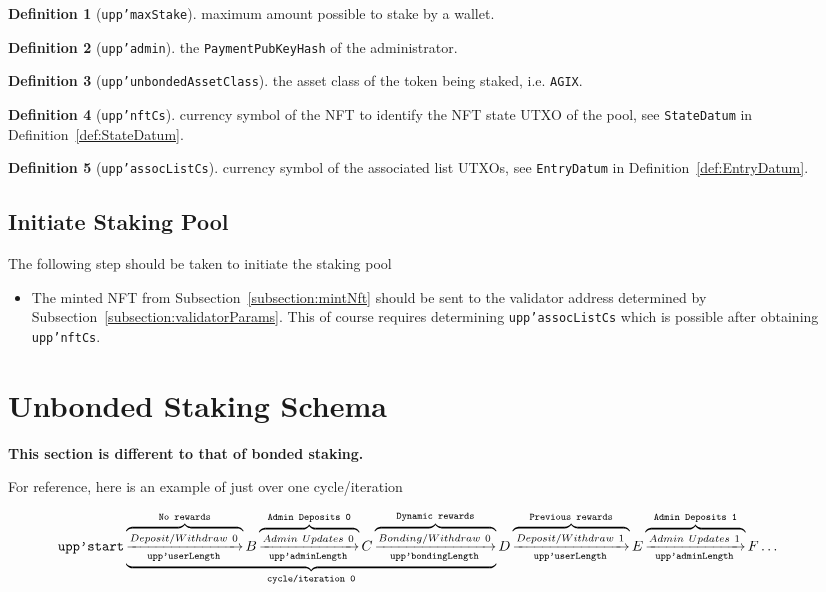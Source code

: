 \documentclass[10pt, a4paper]{article}
\theoremstyle{definition}
\newtheorem{definition}{Definition}[section]
\begin{document}
\begin{definition}[\texttt{upp'maxStake}]\label{def:upp'maxStake}
maximum amount possible to stake by a wallet.
\end{definition}

\begin{definition}[\texttt{upp'admin}]\label{def:upp'admin}
the \texttt{PaymentPubKeyHash} of the administrator.
\end{definition}

\begin{definition}[\texttt{upp'unbondedAssetClass}]\label{def:upp'unbondedAssetClass}
the asset class of the token being staked, i.e. \texttt{AGIX}.
\end{definition}

\begin{definition}[\texttt{upp'nftCs}]\label{def:upp'nftCs}
currency symbol of the NFT to identify the NFT state UTXO of the pool, see \texttt{StateDatum} in Definition~\ref{def:StateDatum}.
\end{definition}

\begin{definition}[\texttt{upp'assocListCs}]\label{def:upp'assocListCs}
currency symbol of the associated list UTXOs, see \texttt{EntryDatum} in Definition~\ref{def:EntryDatum}.
\end{definition}

\subsection{Initiate Staking Pool}
The following step should be taken to initiate the staking pool
\begin{itemize}
\item{The minted NFT from Subsection~\ref{subsection:mintNft} should be sent to the validator address determined by Subsection~\ref{subsection:validatorParams}. This of course requires determining \texttt{upp'assocListCs} which is possible after obtaining \texttt{upp'nftCs}.}
\end{itemize}

\section{Unbonded Staking Schema}
\textbf{This section is different to that of bonded staking.}

For reference, here is an example of just over one cycle/iteration

\begin{equation}\label{eqn:startCycles}
\hspace*{-1cm}
\texttt{upp'start} \underbrace{ \overbrace{\xrightarrow[\texttt{upp'userLength}] {Deposit/Withdraw\ 0}}^\texttt{No rewards} B 
  \overbrace{\xrightarrow[\texttt{upp'adminLength}] {Admin \ Updates \ 0}}^\texttt{Admin Deposits 0} C
\overbrace{\xrightarrow[\texttt{upp'bondingLength}]{Bonding/Withdraw \ 0}}^\texttt{Dynamic rewards}}_\texttt{cycle/iteration 0} D \overbrace{\xrightarrow[\texttt{upp'userLength}] {Deposit/Withdraw\ 1}}^\texttt{Previous rewards} E 
  \overbrace{\xrightarrow[\texttt{upp'adminLength}] {Admin \ Updates \ 1}}^\texttt{Admin Deposits 1} F \ldots
\end{equation}
\end{document}
